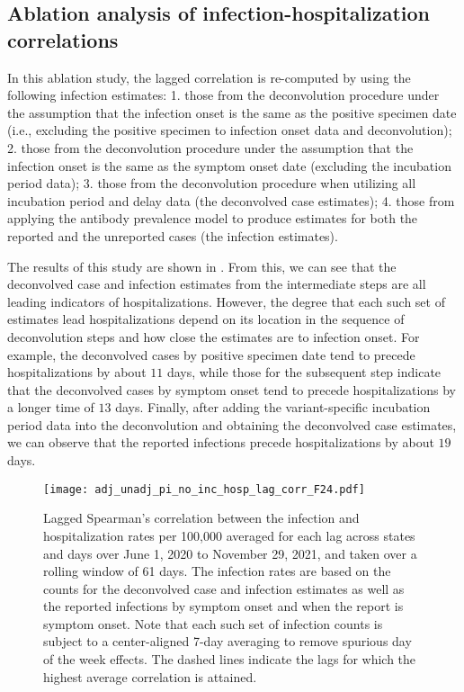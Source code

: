 \subsection{Ablation analysis of infection-hospitalization correlations}
\label{supp:ablation}
In this ablation study, the lagged correlation is re-computed by
using the following infection estimates: 1. those from
the deconvolution procedure under the assumption that the infection onset is the
same as the positive specimen date (i.e., excluding the positive specimen to
infection onset data and deconvolution); 2. those from the deconvolution
procedure under the assumption that the infection onset is the same as the
symptom onset date (excluding the incubation period data); 3. those from the
deconvolution procedure when utilizing all incubation period and delay data (the
deconvolved case estimates); 4. those from applying the antibody prevalence
model to produce estimates for both the reported and the unreported cases (the
infection estimates).

The results of this study are shown in . From
this, we can see that the deconvolved case and infection estimates from the
intermediate steps are all leading indicators of hospitalizations. However, the
degree that each such set of estimates lead hospitalizations depend on its
location in the sequence of deconvolution steps and how close the estimates are to infection
onset. For example, the deconvolved cases by positive specimen date tend to
precede hospitalizations by about $11$ days, while those for the subsequent step
indicate that the deconvolved cases by symptom onset tend to precede
hospitalizations by a longer time of $13$ days. Finally, after adding the
variant-specific incubation period data into the deconvolution and obtaining the
deconvolved case estimates, we can observe that the reported infections precede
hospitalizations by about $19$ days. 

\begin{figure}[H]
\centering
     \texttt{[image: adj\_unadj\_pi\_no\_inc\_hosp\_lag\_corr\_F24.pdf]} 
     \caption{Lagged Spearman's correlation between the infection and
     hospitalization rates per 100,000 averaged for each lag across \US states
     and days over June 1, 2020 to November 29, 2021, and taken over a rolling
     window of 61 days. The infection rates are based on the counts for the
     deconvolved case and infection estimates as well as the reported infections
     by symptom onset and when the report is symptom onset. Note that each such
     set of infection counts is subject to a center-aligned 7-day averaging to
     remove spurious day of the week effects. The dashed lines indicate the lags
     for which the highest average correlation is attained.}
     \label{fig:abl-lag-cor}
 \end{figure}
 